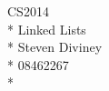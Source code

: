 \documentclass[a4paper,12pt]{article}
\begin{document}
\begin{center}
{\large CS2014} \\*
Linked Lists \\*
Steven Diviney \\*
08462267\\*
\end{center}
\end{document}
